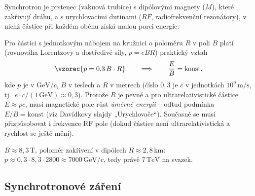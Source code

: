 Synchrotron je prstenec (vakuová trubice) s dipólovými magnety
(\(M\)), které zakřivují dráhu, a s urychlovacími dutinami
(\(RF\), radiofrekvenční rezonátory), v nichž částice při každém oběhu
získá malou porci energie:
\begin{center}
\end{center}
Pro částici s jednotkovým nábojem na kružnici o poloměru \(R\) v poli
\(B\) platí (rovnováha Lorentzovy a dostředivé síly, \(p=eBR\)) praktický
vztah
\[
  \vzorec{p=0{,}3\,B\cdot R}\qquad\Longrightarrow\qquad
  \frac{E}{B}=\text{konst},
\]
kde \(p\) je v \(\mathrm{GeV}/c\), \(B\) v teslech a \(R\) v metrech
(číslo \(0{,}3\) je \(c\) v jednotkách \(10^9\,\mathrm{m/s}\), tj.\
\(e\cdot c/(1\,\mathrm{GeV})\approx0{,}3\)). Protože \(R\) je pevné a pro
ultrarelativistické částice \(E\approx pc\), musí magnetické pole růst
\emph{úměrně energii} -- odtud podmínka \(E/B=\text{konst}\) (viz
Davídkovy slajdy „Urychlovače“). Současně se musí přizpůsobovat i frekvence
RF pole (dokud částice není ultrarelativistická a rychlost se ještě mění).

\begin{priklad}
\(B\approx8{,}3\,\mathrm{T}\), poloměr zakřivení v dipólech
\(R\approx2{,}8\,\mathrm{km}\): \(p\approx0{,}3\cdot8{,}3\cdot2800\approx
7000\,\mathrm{GeV}/c\), tedy právě \(7\,\mathrm{TeV}\) na svazek.
\end{priklad}

\subsection{Synchrotronové záření}

